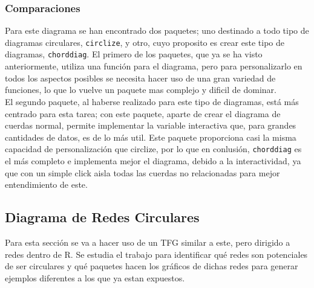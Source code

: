 \documentclass{article}\usepackage[]{graphicx}\usepackage[]{color}
\begin{document}
\subsubsection{Comparaciones}
Para este diagrama se han encontrado dos paquetes; uno destinado a todo tipo de diagramas circulares, \texttt{circlize}, y otro, cuyo proposito es crear este tipo de diagramas, \texttt{chorddiag}. El primero de los paquetes, que ya se ha visto anteriormente, utiliza una funci\'on para el diagrama, pero para personalizarlo en todos los aspectos posibles se necesita hacer uso de una gran variedad de funciones, lo que lo vuelve un paquete mas complejo y dificil de dominar.~\\
El segundo paquete, al haberse realizado para este tipo de diagramas, est\'a m\'as centrado para esta tarea; con este paquete, aparte de crear el diagrama de cuerdas normal, permite implementar la variable interactiva que, para grandes cantidades de datos, es de lo m\'as util. Este paquete proporciona casi la misma capacidad de personalizaci\'on que circlize, por lo que en conlusi\'on, \texttt{chorddiag} es el m\'as completo e implementa mejor el diagrama, debido a la interactividad, ya que con un simple click aisla todas las cuerdas no relacionadas para mejor entendimiento de este.
\clearpage
\subsection{Diagrama de Redes Circulares}\label{ssec:redes}
Para esta secci\'on se va a hacer uso de un TFG \cite{tfg}
 similar a este, pero dirigido a redes dentro de R. Se estudia el trabajo para identificar qu\'e redes son potenciales de ser circulares y qu\'e paquetes hacen los gr\'aficos de dichas redes para generar ejemplos diferentes a los que ya estan expuestos.
\end{document}
